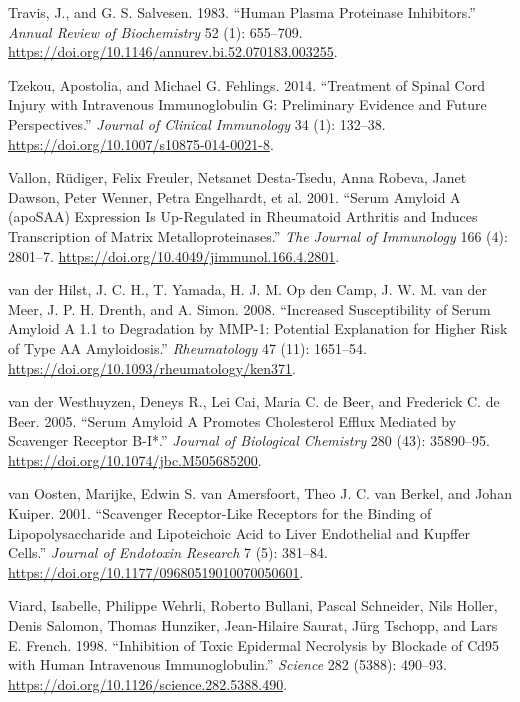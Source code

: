 \documentclass[9pt,lineno]{elife}
\newlength{\cslhangindent}
\newlength{\cslentryspacingunit} %
\newenvironment{CSLReferences}[2] %
 {%
  \setlength{\parindent}{0pt}
  \ifodd #1
  \let\oldpar\par
  \def\par{\hangindent=\cslhangindent\oldpar}
  \fi
  \setlength{\parskip}{#2\cslentryspacingunit}
 }%
 {}
\begin{document}
\begin{CSLReferences}{1}{0}
\leavevmode{}%
Travis, J., and G. S. Salvesen. 1983. {``Human Plasma Proteinase Inhibitors.''} \emph{Annual Review of Biochemistry} 52 (1): 655--709. \url{https://doi.org/10.1146/annurev.bi.52.070183.003255}.

\leavevmode{}%
Tzekou, Apostolia, and Michael G. Fehlings. 2014. {``Treatment of {Spinal Cord Injury} with {Intravenous Immunoglobulin G}: {Preliminary Evidence} and {Future Perspectives}.''} \emph{Journal of Clinical Immunology} 34 (1): 132--38. \url{https://doi.org/10.1007/s10875-014-0021-8}.

\leavevmode{}%
Vallon, Rüdiger, Felix Freuler, Netsanet Desta-Tsedu, Anna Robeva, Janet Dawson, Peter Wenner, Petra Engelhardt, et al. 2001. {``Serum {Amyloid A} ({apoSAA}) {Expression Is Up-Regulated} in {Rheumatoid Arthritis} and {Induces Transcription} of {Matrix Metalloproteinases}.''} \emph{The Journal of Immunology} 166 (4): 2801--7. \url{https://doi.org/10.4049/jimmunol.166.4.2801}.

\leavevmode{}%
van der Hilst, J. C. H., T. Yamada, H. J. M. Op den Camp, J. W. M. van der Meer, J. P. H. Drenth, and A. Simon. 2008. {``Increased Susceptibility of Serum Amyloid {A} 1.1 to Degradation by {MMP-1}: Potential Explanation for Higher Risk of Type {AA} Amyloidosis.''} \emph{Rheumatology} 47 (11): 1651--54. \url{https://doi.org/10.1093/rheumatology/ken371}.

\leavevmode{}%
van der Westhuyzen, Deneys R., Lei Cai, Maria C. de Beer, and Frederick C. de Beer. 2005. {``Serum {Amyloid A Promotes Cholesterol Efflux Mediated} by {Scavenger Receptor B-I}*.''} \emph{Journal of Biological Chemistry} 280 (43): 35890--95. \url{https://doi.org/10.1074/jbc.M505685200}.

\leavevmode{}%
van Oosten, Marijke, Edwin S. van Amersfoort, Theo J. C. van Berkel, and Johan Kuiper. 2001. {``Scavenger Receptor-Like Receptors for the Binding of Lipopolysaccharide and Lipoteichoic Acid to Liver Endothelial and {Kupffer} Cells.''} \emph{Journal of Endotoxin Research} 7 (5): 381--84. \url{https://doi.org/10.1177/09680519010070050601}.

\leavevmode{}%
Viard, Isabelle, Philippe Wehrli, Roberto Bullani, Pascal Schneider, Nils Holler, Denis Salomon, Thomas Hunziker, Jean-Hilaire Saurat, Jürg Tschopp, and Lars E. French. 1998. {``Inhibition of {Toxic Epidermal Necrolysis} by {Blockade} of {Cd95} with {Human Intravenous Immunoglobulin}.''} \emph{Science} 282 (5388): 490--93. \url{https://doi.org/10.1126/science.282.5388.490}.


\end{CSLReferences}
\end{document}
